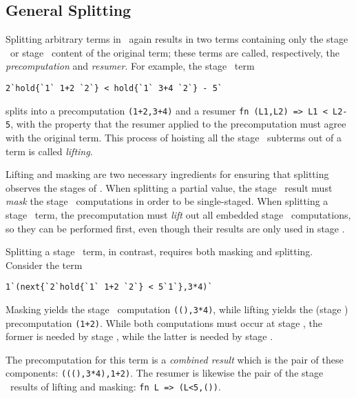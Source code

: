 
\subsection{General Splitting}

Splitting arbitrary terms in \lang\ again results in two terms containing only
the stage \bbone\ or stage \bbtwo\ content of the original term; these terms are
called, respectively, the {\em precomputation} and {\em resumer}.
%
For example, the stage \bbtwo\ term
\begin{lstlisting}
2`hold{`1` 1+2 `2`} < hold{`1` 3+4 `2`} - 5`
\end{lstlisting}
splits into a precomputation \verb|(1+2,3+4)| and a resumer
\verb|fn (L1,L2) => L1 < L2-5|, with the property that the resumer applied to
the precomputation must agree with the original term. This process of hoisting
all the stage \bbone\ subterms out of a term is called \emph{lifting}.

Lifting and masking are two necessary ingredients for ensuring that splitting
observes the stages of \lang. When splitting a partial value, the stage \bbone\
result must \emph{mask} the stage \bbtwo\ computations in order to be
single-staged. When splitting a stage \bbtwo\ term, the precomputation must
\emph{lift} out all embedded stage \bbone\ computations, so they can be
performed first, even though their results are only used in stage \bbtwo.

Splitting a stage \bbone\ term, in contrast, requires both masking and splitting.
Consider the term 
\begin{lstlisting}
1`(next{`2`hold{`1` 1+2 `2`} < 5`1`},3*4)`
\end{lstlisting}
Masking yields the stage \bbone\ computation \verb|((),3*4)|, while lifting
yields the (stage \bbone) precomputation \verb|(1+2)|. While both computations
must occur at stage \bbone, the former is needed by stage \bbone, while the
latter is needed by stage \bbtwo.

The precomputation for this term is a \emph{combined result} which is
the pair of these components: \verb|(((),3*4),1+2)|. The resumer is
likewise the pair of the stage \bbtwo\ results of lifting and masking:
\verb|fn L => (L<5,())|.

